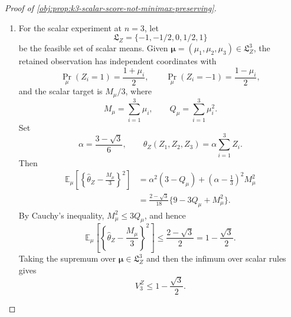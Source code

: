 \begin{proof}[Proof of \cref{obj:prop:k3-scalar-score-not-minimax-preserving}]
\begin{enumerate}
\item
For the scalar experiment at \(n=3\), let
\[
\mathfrak L_Z=\{-1,-1/2,0,1/2,1\}
\]
be the feasible set of scalar means. Given \(\boldsymbol\mu=(\mu_1,\mu_2,\mu_3)\in\mathfrak L_Z^3\), the retained observation has independent coordinates with
\[
\Pr_\mu(Z_i=1)=\frac{1+\mu_i}{2},
\qquad
\Pr_\mu(Z_i=-1)=\frac{1-\mu_i}{2},
\]
and the scalar target is \(M_\mu/3\), where
\[
M_\mu=\sum_{i=1}^3\mu_i,
\qquad
Q_\mu=\sum_{i=1}^3\mu_i^2 .
\]
Set
\[
\alpha=\frac{3-\sqrt3}{6},
\qquad
\widehat\theta_Z(Z_1,Z_2,Z_3)=\alpha\sum_{i=1}^3 Z_i .
\]
Then
\[
\begin{aligned}
\mathbb E_\mu\!\left[
\left\{\widehat\theta_Z-\frac{M_\mu}{3}\right\}^2\right]
&=\alpha^2(3-Q_\mu)+\left(\alpha-\frac13\right)^2M_\mu^2  \\
&=\frac{2-\sqrt3}{18}\{9-3Q_\mu+M_\mu^2\}.
\end{aligned}
\]
By Cauchy's inequality, \(M_\mu^2\le3Q_\mu\), and hence
\[
\mathbb E_\mu\!\left[
\left\{\widehat\theta_Z-\frac{M_\mu}{3}\right\}^2\right]
\le \frac{2-\sqrt3}{2}
=1-\frac{\sqrt3}{2}.
\]
Taking the supremum over \(\boldsymbol\mu\in\mathfrak L_Z^3\) and then the infimum over scalar rules gives
\[
V_3^Z\le 1-\frac{\sqrt3}{2}.
\]


\end{enumerate}
\end{proof}
